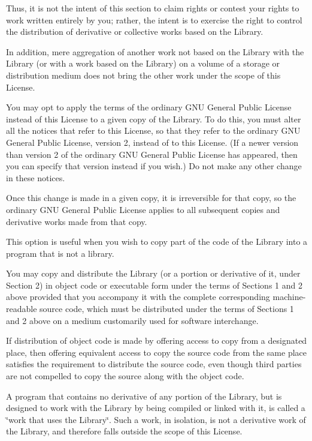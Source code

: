 Thus, it is not the intent of this section to claim rights or contest your rights to work written entirely by you; rather, the intent is to exercise the right to control the distribution of derivative or collective works based on the Library.

In addition, mere aggregation of another work not based on the Library with the Library (or with a work based on the Library) on a volume of a storage or distribution medium does not bring the other work under the scope of this License.
\begin{DoxyEnumerate}
\item You may opt to apply the terms of the ordinary G\-N\-U General Public License instead of this License to a given copy of the Library. To do this, you must alter all the notices that refer to this License, so that they refer to the ordinary G\-N\-U General Public License, version 2, instead of to this License. (If a newer version than version 2 of the ordinary G\-N\-U General Public License has appeared, then you can specify that version instead if you wish.) Do not make any other change in these notices.
\end{DoxyEnumerate}

Once this change is made in a given copy, it is irreversible for that copy, so the ordinary G\-N\-U General Public License applies to all subsequent copies and derivative works made from that copy.

This option is useful when you wish to copy part of the code of the Library into a program that is not a library.
\begin{DoxyEnumerate}
\item You may copy and distribute the Library (or a portion or derivative of it, under Section 2) in object code or executable form under the terms of Sections 1 and 2 above provided that you accompany it with the complete corresponding machine-\/readable source code, which must be distributed under the terms of Sections 1 and 2 above on a medium customarily used for software interchange.
\end{DoxyEnumerate}

If distribution of object code is made by offering access to copy from a designated place, then offering equivalent access to copy the source code from the same place satisfies the requirement to distribute the source code, even though third parties are not compelled to copy the source along with the object code.
\begin{DoxyEnumerate}
\item A program that contains no derivative of any portion of the Library, but is designed to work with the Library by being compiled or linked with it, is called a \char`\"{}work that uses the Library\char`\"{}. Such a work, in isolation, is not a derivative work of the Library, and therefore falls outside the scope of this License.
\end{DoxyEnumerate}

